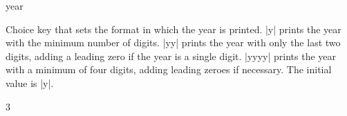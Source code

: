 \documentclass{beerydoc}
\begin{document}
\begin{codedoc}{year}
  \begin{syntax}
  \end{syntax}
  Choice key that sets the format in which the year is printed.
  |y| prints the year with the minimum number of digits.
  |yy| prints the year with only the last two digits, adding a leading zero if
  the year is a single digit.
  |yyyy| prints the year with a minimum of four digits, adding leading zeroes
  if necessary.
  The initial value is |y|.
  \begin{codedemo}
    \begin{multicols}{3}
      \\
      \\
      \\
      \\
      \\
      \\
      \\
      \\
      \\
      \\
      \\
      \\
      \\
      \\
      \\
      \\
      \\
      \\
      \\
      \\
      \\
      \\
      \\
    \end{multicols}
  \end{codedemo}
\end{codedoc}
\end{document}
